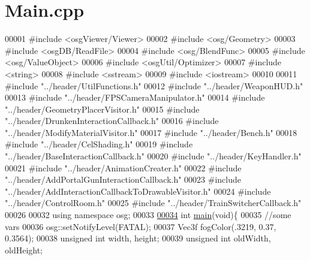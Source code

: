 \hypertarget{_main_8cpp_source}{\section{Main.\+cpp}
\label{_main_8cpp_source}
}

\begin{DoxyCode}
00001 \textcolor{preprocessor}{#include <osgViewer/Viewer>}
00002 \textcolor{preprocessor}{#include <osg/Geometry>}
00003 \textcolor{preprocessor}{#include <osgDB/ReadFile>}
00004 \textcolor{preprocessor}{#include <osg/BlendFunc>}
00005 \textcolor{preprocessor}{#include <osg/ValueObject>}
00006 \textcolor{preprocessor}{#include <osgUtil/Optimizer>}
00007 \textcolor{preprocessor}{#include <string>}
00008 \textcolor{preprocessor}{#include <sstream>}
00009 \textcolor{preprocessor}{#include <iostream>}
00010 
00011 \textcolor{preprocessor}{#include "../header/UtilFunctions.h"}
00012 \textcolor{preprocessor}{#include "../header/WeaponHUD.h"}
00013 \textcolor{preprocessor}{#include "../header/FPSCameraManipulator.h"}
00014 \textcolor{preprocessor}{#include "../header/GeometryPlacerVisitor.h"}
00015 \textcolor{preprocessor}{#include "../header/DrunkenInteractionCallback.h"}
00016 \textcolor{preprocessor}{#include "../header/ModifyMaterialVisitor.h"}
00017 \textcolor{preprocessor}{#include "../header/Bench.h"}
00018 \textcolor{preprocessor}{#include "../header/CelShading.h"}
00019 \textcolor{preprocessor}{#include "../header/BaseInteractionCallback.h"}
00020 \textcolor{preprocessor}{#include "../header/KeyHandler.h"}
00021 \textcolor{preprocessor}{#include "../header/AnimationCreater.h"}
00022 \textcolor{preprocessor}{#include "../header/AddPortalGunInteractionCallback.h"}
00023 \textcolor{preprocessor}{#include "../header/AddInteractionCallbackToDrawableVisitor.h"}
00024 \textcolor{preprocessor}{#include "../header/ControlRoom.h"}
00025 \textcolor{preprocessor}{#include "../header/TrainSwitcherCallback.h"}
00026 
00032 \textcolor{keyword}{using namespace }osg;
00033 
\hypertarget{_main_8cpp_source_l00034}{}\hyperlink{_main_8cpp_a840291bc02cba5474a4cb46a9b9566fe}{00034} \textcolor{keywordtype}{int} \hyperlink{_main_8cpp_a840291bc02cba5474a4cb46a9b9566fe}{main}(\textcolor{keywordtype}{void})\{
00035     \textcolor{comment}{//some vars}
00036     osg::setNotifyLevel(FATAL);
00037     Vec3f fogColor(.3219, 0.37, 0.3564);
00038     \textcolor{keywordtype}{unsigned} \textcolor{keywordtype}{int} width, height;
00039     \textcolor{keywordtype}{unsigned} \textcolor{keywordtype}{int} oldWidth, oldHeight;

\end{DoxyCode}
